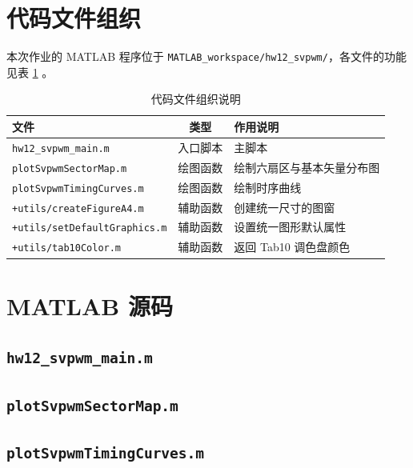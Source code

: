 \documentclass[a4paper, 12pt]{ctexart}
\begin{document}
\appendix
\clearpage
\section{代码文件组织}

本次作业的 MATLAB 程序位于 \texttt{MATLAB\_workspace/hw12\_svpwm/}，各文件的功能见表 \ref{tab:hw12-files} 。

\begin{table}[H]
  \centering
  \caption{代码文件组织说明}
  \label{tab:hw12-files}
  \begin{tabularx}{\textwidth}{>{\raggedright\arraybackslash}p{} c >{\raggedright\arraybackslash}X}
    \toprule
    文件                                      & 类型   & 作用说明           \\
    \midrule
    \nolinkurl{hw12_svpwm_main.m}           & 入口脚本 & 主脚本            \\
    \nolinkurl{plotSvpwmSectorMap.m}        & 绘图函数 & 绘制六扇区与基本矢量分布图  \\
    \nolinkurl{plotSvpwmTimingCurves.m}     & 绘图函数 & 绘制时序曲线         \\
    \nolinkurl{+utils/createFigureA4.m}     & 辅助函数 & 创建统一尺寸的图窗      \\
    \nolinkurl{+utils/setDefaultGraphics.m} & 辅助函数 & 设置统一图形默认属性     \\
    \nolinkurl{+utils/tab10Color.m}         & 辅助函数 & 返回 Tab10 调色盘颜色 \\
    \bottomrule
  \end{tabularx}
\end{table}

\section{MATLAB 源码}

\subsection*{\texttt{hw12\_svpwm\_main.m}}

\subsection*{\texttt{plotSvpwmSectorMap.m}}

\subsection*{\texttt{plotSvpwmTimingCurves.m}}
\end{document}
